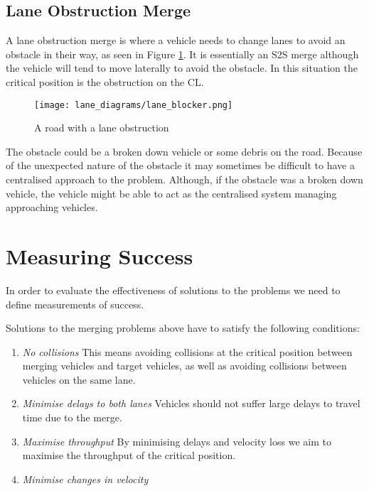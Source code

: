 \subsection{Lane Obstruction Merge}
\label{subsec:Lane Obstruction Merge}
A lane obstruction merge is where a vehicle needs to change lanes to avoid an obstacle in their way, as seen in Figure \ref{fig:LaneObstruction}. It is essentially an S2S merge although the vehicle will tend to move laterally to avoid the obstacle. In this situation the critical position is the obstruction on the CL. 

\begin{figure}[htb]
\texttt{[image: lane\_diagrams/lane\_blocker.png]}
\caption{A road with a lane obstruction}
\label{fig:LaneObstruction}
\end{figure}

The obstacle could be a broken down vehicle or some debris on the road. Because of the unexpected nature of the obstacle it may sometimes be difficult to have a centralised approach to the problem. Although, if the obstacle was a broken down vehicle, the vehicle might be able to act as the centralised system managing approaching vehicles. 

\section{Measuring Success}
\label{sec:Measuring Success}
In order to evaluate the effectiveness of solutions to the problems we need to define measurements of success. 

Solutions to the merging problems above have to satisfy the following conditions:

\begin{enumerate}
\item \textit{No collisions}
This means avoiding collisions at the critical position between merging vehicles and target vehicles, as well as avoiding collisions between vehicles on the same lane.
\item \textit{Minimise delays to both lanes}
Vehicles should not suffer large delays to travel time due to the merge. 
\item \textit{Maximise throughput}
By minimising delays and velocity loss we aim to maximise the throughput of the critical position.
\item \textit{Minimise changes in velocity}
\end{enumerate}

